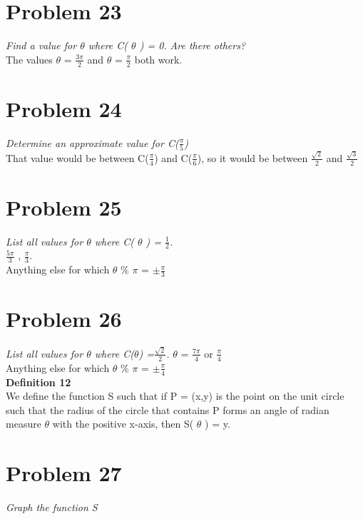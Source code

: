 \documentclass[11pt]{article} %
\newcommand\tab[1][1cm]{\hspace*{#1}}
\begin{document}
\section{Problem 23}
\textit{ Find a value for $\theta$ where C( $\theta$ ) = 0. Are there others?}
\\ \tab The values $\theta$ = $\frac{3\pi}{2}$  and $\theta$ = $\frac{\pi}{2}$ both work.

\section{Problem 24}
\textit{Determine an approximate value for C($\frac{\pi}{5}$)}
\\ \tab That value would be between C($\frac{\pi}{4}$) and C($\frac{\pi}{6}$), 
so it would be between $\frac{\sqrt{2}}{2}$ and $\frac{\sqrt{3}}{2}$

\section{Problem 25}
\textit{ List all values for $\theta$ where C( $\theta$ ) = $\frac{1}{2}$.}
\\ \tab $\frac{5\pi}{3}$ , $\frac{\pi}{3}$.
\\ \tab Anything else for which $\theta$ $\%$  $\pi$ = $\pm\frac{\pi}{3}$

\section{Problem 26}
\textit{List all values for $\theta$ where C($\theta$) =$\frac{\sqrt{2}}{2}$. }
$\theta$ =  $\frac{7\pi}{4}$ or  $\frac{\pi}{4}$
\\ \tab Anything else for which $\theta$ $\%$ $\pi$ = $\pm\frac{\pi}{4}$
\\
\textbf{Definition 12}
\\ We define the function S such that if P = (x,y) is the point on the unit circle such that the radius of the circle that contains P forms an angle of radian measure $\theta$ with the positive x-axis, then S( $\theta$ ) = y.

\section{Problem 27}
\textit{Graph the function S}
\\
\end{document}
